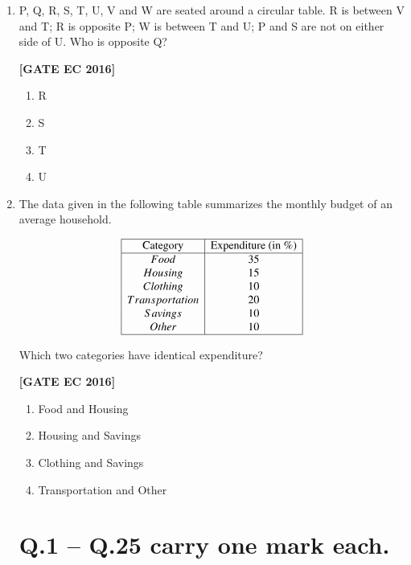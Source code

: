\documentclass[12pt]{article}
\begin{document}
\begin{enumerate}[label=\textbf{Q.\arabic*.}, start=6, itemsep=2em]
\item P, Q, R, S, T, U, V and W are seated around a circular table. R is between V and T; R is opposite P; W is between T and U; P and S are not on either side of U. Who is opposite Q?

\noindent \textbf{[GATE EC 2016]}

\begin{multicols}{4}
\begin{enumerate}[label=\Alph*.]
    \item R
    \item S
    \item T
    \item U
\end{enumerate}
\end{multicols}

\item The data given in the following table summarizes the monthly budget of an average household.

\[
\begin{array}{|c|c|}
\hline
\text{Category} & \text{Expenditure (in \%)} \\
\hline
Food & 35 \\
Housing & 15 \\
Clothing & 10 \\
Transportation & 20 \\
Savings & 10 \\
Other & 10 \\
\hline
\end{array}
\]

Which two categories have identical expenditure?

\noindent \textbf{[GATE EC 2016]}

\begin{multicols}{2}
\begin{enumerate}[label=\Alph*.]
    \item Food and Housing
    \item Housing and Savings
    \item Clothing and Savings
    \item Transportation and Other
\end{enumerate}
\end{multicols}

\section*{Q.1 -- Q.25 carry one mark each.}
\begin{enumerate}[label=\textbf{Q.\arabic*.}]


\end{enumerate}
\end{enumerate}
\end{document}
